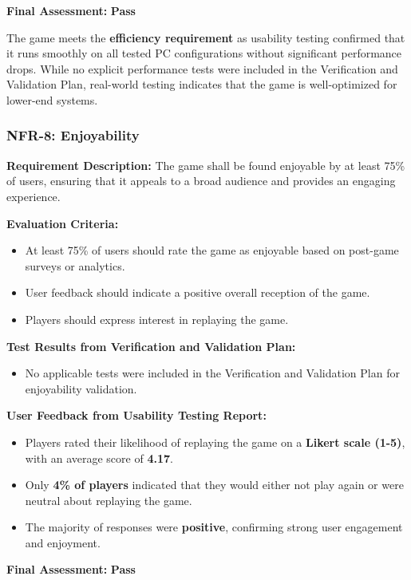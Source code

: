 \documentclass[12pt, titlepage]{article}
\begin{document}
\textbf{Final Assessment:} \textbf{Pass} 
 
The game meets the \textbf{efficiency requirement} as usability testing confirmed that it runs smoothly on all tested PC configurations without significant performance drops. While no explicit performance tests were included in the Verification and Validation Plan, real-world testing indicates that the game is well-optimized for lower-end systems.


\subsubsection{NFR-8: Enjoyability}
\label{NFR8}

\textbf{Requirement Description:}  
The game shall be found enjoyable by at least 75\% of users, ensuring that it appeals to a broad audience and provides an engaging experience.

\textbf{Evaluation Criteria:}  
\begin{itemize}
    \item At least 75\% of users should rate the game as enjoyable based on post-game surveys or analytics.
    \item User feedback should indicate a positive overall reception of the game.
    \item Players should express interest in replaying the game.
\end{itemize}

\textbf{Test Results from Verification and Validation Plan:}  
\begin{itemize}
    \item No applicable tests were included in the Verification and Validation Plan for enjoyability validation.
\end{itemize}

\textbf{User Feedback from Usability Testing Report:}  
\begin{itemize}
    \item Players rated their likelihood of replaying the game on a \textbf{Likert scale (1-5)}, with an average score of \textbf{4.17}.
    \item Only \textbf{4\% of players} indicated that they would either not play again or were neutral about replaying the game.
    \item The majority of responses were \textbf{positive}, confirming strong user engagement and enjoyment.
\end{itemize}

\textbf{Final Assessment:} \textbf{Pass} 
 
\end{document}
